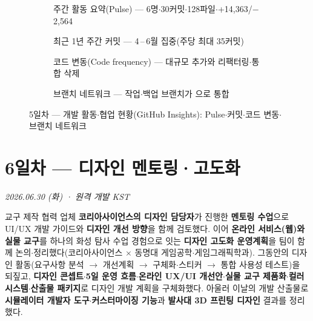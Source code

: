 \begin{figure}[htbp]\centering
  \begin{subfigure}{0.49\linewidth}\centering
    \caption{주간 활동 요약(Pulse) — 6명$\cdot$30커밋$\cdot$128파일$\cdot$+14,363/$-$2,564}
  \end{subfigure}\hfill
  \begin{subfigure}{0.49\linewidth}\centering
    \caption{최근 1년 주간 커밋 — 4\,--\,6월 집중(주당 최대 35커밋)}
  \end{subfigure}

  \medskip
  \begin{subfigure}{0.49\linewidth}\centering
    \caption{코드 변동(Code frequency) — 대규모 추가와 리팩터링$\cdot$통합 삭제}
  \end{subfigure}\hfill
  \begin{subfigure}{0.49\linewidth}\centering
    \caption{브랜치 네트워크 — 작업$\cdot$백업 브랜치가 으로 통합}
  \end{subfigure}
  \caption{5일차 — 개발 활동$\cdot$협업 현황(GitHub Insights): Pulse$\cdot$커밋$\cdot$코드 변동$\cdot$브랜치 네트워크}
\end{figure}

\chapter{6일차 — 디자인 멘토링·고도화}
\textit{2026.06.30 (화) · 원격 개발 KST}

\begin{summarybox}
교구 제작 협력 업체 \textbf{코리아사이언스의 디자인 담당자}가 진행한 \textbf{멘토링 수업}으로
UI/UX 개발 가이드와 \textbf{디자인 개선 방향}을 함께 검토했다. 이어 \textbf{온라인 서비스(웹)와
실물 교구}를 하나의 화성 탐사 수업 경험으로 잇는 \textbf{디자인 고도화 운영계획}을 팀이 함께
논의$\cdot$정리했다(코리아사이언스 $\times$ 동명대 게임공학$\cdot$게임그래픽학과). 그동안의 디자인
활동(요구사항 분석 $\to$ 개선계획 $\to$ 구체화$\cdot$스티커 $\to$ 통합 사용성 테스트)을 되짚고,
\textbf{디자인 콘셉트$\cdot$5일 운영 흐름$\cdot$온라인 UX/UI 개선안$\cdot$실물 교구 제품화$\cdot$컬러
시스템$\cdot$산출물 패키지}로 디자인 개발 계획을 구체화했다. 아울러 이날의 개발 산출물로
\textbf{시뮬레이터 개발자 도구$\cdot$커스터마이징 기능}과 \textbf{발사대 3D 프린팅 디자인} 결과를
정리했다.
\end{summarybox}

